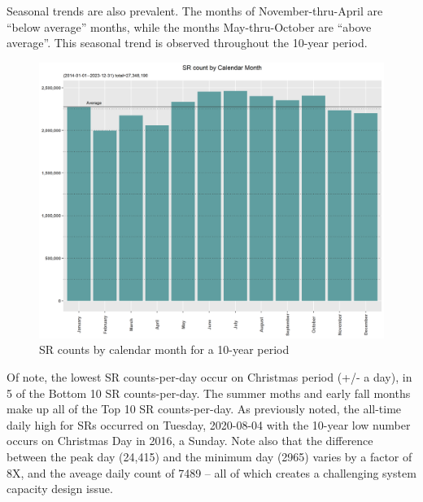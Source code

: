 \documentclass[12pt, titlepage]{article}
\begin{document}
Seasonal trends are also prevalent. The months of November-thru-April are ``below average'' months, while the months May-thru-October are ``above average''. 
This seasonal trend is observed throughout the 10-year period.

\begin{figure}[H]
  \centering
  \includegraphics[width=\textwidth]{Calendar-Month.png}
  \caption{SR counts by calendar month for a 10-year period}
  \label{fig:calendar-months-counts}
\end{figure}

Of note, the lowest SR counts-per-day occur on Christmas  period (+/- a day), in 5 of the Bottom 10 SR counts-per-day. The summer moths and early
fall months make up all of the Top 10 SR counts-per-day. As previously noted, the all-time daily high for SRs occurred on Tuesday, 2020-08-04 with the 10-year
low number occurs on Christmas Day in 2016, a Sunday. Note also that the difference between the peak day (24,415) and the minimum day (2965) varies
by a factor of 8X, and the aveage daily count of 7489 -- all of which creates a challenging  system capacity design issue.
\end{document}
